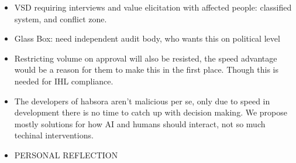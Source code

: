 \begin{itemize}
    \item VSD requiring interviews and value elicitation with affected people: classified system, and conflict zone.
    \item Glass Box: need independent audit body, who wants this on political level
    \item Restricting volume on approval will also be resisted, the speed advantage would be a reason for them to make this in the first place. Though this is needed for IHL compliance.
    \item The developers of habsora aren't malicious per se, only due to speed in development there is no time to catch up with decision making. We propose mostly solutions for how AI and humans should interact, not so much techinal interventions.
    \item PERSONAL REFLECTION
\end{itemize}